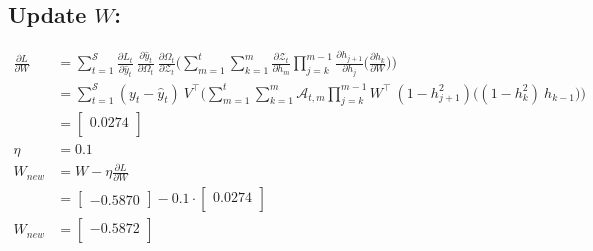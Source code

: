 \documentclass{article}
\begin{document}
\subsection{Update $W$:}
\begin{align*}
    \frac{\partial L}{ \partial{W}} &= 
\sum_{t=1}^{\mathcal{S}}
\frac{\partial L_t}{\partial \hat{y}_t}~\frac{\partial \hat{y}_t}{\partial \Omega_t}~\frac{\partial \Omega_t}{ \partial \mathcal{Z}_t} \biggl( 
\sum_{m=1}^{t}
\sum_{k=1}^{m} \frac{\partial \mathcal{Z}_t}{ \partial h_m} 
\prod_{j=k}^{m-1} \frac{\partial h_{j+1}}{ \partial h_j} 
\biggl( \frac{\partial h_k}{ \partial W} \biggl) \biggl) \\
  &=
\sum_{t=1}^{\mathcal{S}}
(y_t - \hat{y}_t)~V^\top \biggl( 
\sum_{m=1}^{t}
\sum_{k=1}^{m} \mathcal{A}_{t,m} 
\prod_{j=k}^{m-1} W^\top ~ (1 - h_{j+1}^2)
\biggl( (1-h_k^2)~ h_{k-1} \biggl) \biggl) \\
 &= \begin{bmatrix}
0.0274 \\
\end{bmatrix}\\
\eta &= 0.1\\
W_{new} &= W - \eta \frac{\partial L}{\partial W}\\
&= \begin{bmatrix}
    -0.5870
\end{bmatrix}- 0.1 \cdot \begin{bmatrix}
0.0274 \\
\end{bmatrix}\\
W_{new} &= \begin{bmatrix}
-0.5872 \\
\end{bmatrix}
\end{align*}
\end{document}
